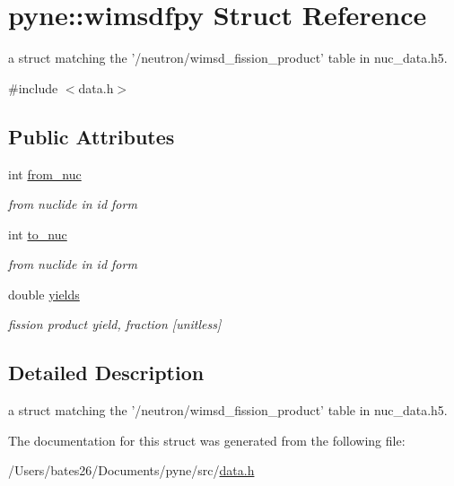 \hypertarget{structpyne_1_1wimsdfpy}{\section{pyne\+:\+:wimsdfpy Struct Reference}
\label{structpyne_1_1wimsdfpy}
}


a struct matching the '/neutron/wimsd\+\_\+fission\+\_\+product' table in nuc\+\_\+data.\+h5.  




{\ttfamily \#include $<$data.\+h$>$}

\subsection*{Public Attributes}
\begin{DoxyCompactItemize}
\item 
\hypertarget{structpyne_1_1wimsdfpy_a7521e458719ebb8ed23f4912ec4555f8}{int \hyperlink{structpyne_1_1wimsdfpy_a7521e458719ebb8ed23f4912ec4555f8}{from\+\_\+nuc}}\label{structpyne_1_1wimsdfpy_a7521e458719ebb8ed23f4912ec4555f8}

\begin{DoxyCompactList}\small\item\em from nuclide in id form \end{DoxyCompactList}\item 
\hypertarget{structpyne_1_1wimsdfpy_a2a0f913a64fb76c5c82e1212df7fbb6c}{int \hyperlink{structpyne_1_1wimsdfpy_a2a0f913a64fb76c5c82e1212df7fbb6c}{to\+\_\+nuc}}\label{structpyne_1_1wimsdfpy_a2a0f913a64fb76c5c82e1212df7fbb6c}

\begin{DoxyCompactList}\small\item\em from nuclide in id form \end{DoxyCompactList}\item 
\hypertarget{structpyne_1_1wimsdfpy_a1c20eef7a02f2f62dba113cbf24d8bf2}{double \hyperlink{structpyne_1_1wimsdfpy_a1c20eef7a02f2f62dba113cbf24d8bf2}{yields}}\label{structpyne_1_1wimsdfpy_a1c20eef7a02f2f62dba113cbf24d8bf2}

\begin{DoxyCompactList}\small\item\em fission product yield, fraction \mbox{[}unitless\mbox{]} \end{DoxyCompactList}\end{DoxyCompactItemize}


\subsection{Detailed Description}
a struct matching the '/neutron/wimsd\+\_\+fission\+\_\+product' table in nuc\+\_\+data.\+h5. 

The documentation for this struct was generated from the following file\+:\begin{DoxyCompactItemize}
\item 
/\+Users/bates26/\+Documents/pyne/src/\hyperlink{data_8h}{data.\+h}\end{DoxyCompactItemize}
